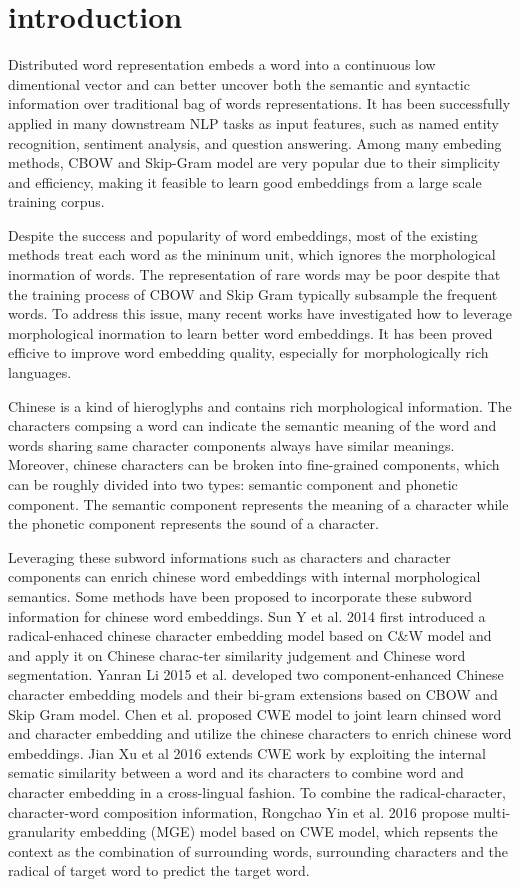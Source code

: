 \section{introduction}
Distributed word representation embeds a word into a continuous low dimentional vector and can better uncover both the semantic and syntactic information over traditional bag of words representations. It has been successfully applied in many downstream NLP tasks as input features, such as named entity recognition, sentiment analysis, and question answering. Among many embeding methods, CBOW and Skip-Gram model are very popular due to their simplicity and efficiency, making it feasible to learn good embeddings from a large scale training corpus. 

Despite the success and popularity of word embeddings, most of the existing methods treat each word as the mininum unit, which ignores the  morphological inormation of words. The representation of rare words may be poor despite that the training process of CBOW and Skip Gram typically subsample the frequent words. To address this issue, many recent works have investigated how to leverage morphological inormation to learn  better word embeddings. It has been proved efficive to improve word embedding quality, especially for morphologically rich languages.

Chinese is a kind of hieroglyphs and contains rich morphological information. The characters compsing a word can indicate the semantic meaning of the word and words sharing same character components always have similar meanings. Moreover, chinese characters can be broken into fine-grained components, which can be roughly divided into two types: semantic component and phonetic component. The semantic component represents the meaning of a character while the phonetic component represents the sound of a character. 

Leveraging these subword informations such as characters and character components can enrich chinese word embeddings with internal morphological semantics. Some methods have been proposed to incorporate these subword information for chinese word embeddings.  Sun Y et al. 2014 first introduced a radical-enhaced chinese character embedding model based on C\&W model and and  apply  it  on  Chinese  charac-ter similarity judgement and Chinese word segmentation. Yanran Li 2015 et al. developed two component-enhanced Chinese character embedding models and their bi-gram extensions based on CBOW and Skip Gram model.  Chen et al. proposed CWE model to joint learn chinsed word and character embedding and utilize the chinese characters to enrich chinese word embeddings. Jian Xu et al 2016 extends CWE work by exploiting the internal sematic similarity between a word and its characters  to combine word and character embedding  in a cross-lingual fashion. To combine the radical-character, character-word composition information, Rongchao Yin et al. 2016 propose multi-granularity embedding (MGE) model based on CWE model, which repsents the context as the combination of surrounding words, surrounding characters and the radical of target word to predict the target word. 

